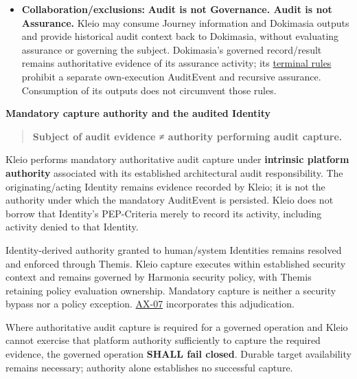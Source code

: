 \begin{itemize}
\item \textbf{Collaboration/exclusions:} \textbf{Audit is not Governance. Audit is not Assurance.}
  Kleio may consume Journey information and Dokimasia outputs and provide
  historical audit context back to Dokimasia, without evaluating assurance or
  governing the subject. Dokimasia's governed record/result remains authoritative
  evidence of its assurance activity; its \href{\detokenize{../../../../../docs/markdown/05-information-systems-architecture/component-register.md#dokimasia-terminal-boundaries}}{terminal rules}
  prohibit a separate own-execution AuditEvent and recursive assurance. Consumption
  of its outputs does not circumvent those rules.

\end{itemize}






\par\medskip\textbf{Mandatory capture authority and the audited Identity}\par


\begin{quote}


\textbf{Subject of audit evidence ≠ authority performing audit capture.}



\end{quote}


Kleio performs mandatory authoritative audit capture under \textbf{intrinsic platform
authority} associated with its established architectural audit responsibility.
The originating/acting Identity remains evidence recorded by Kleio; it is not
the authority under which the mandatory AuditEvent is persisted. Kleio does not
borrow that Identity's PEP-Criteria merely to record its activity, including
activity denied to that Identity.



Identity-derived authority granted to human/system Identities remains resolved
and enforced through Themis. Kleio capture executes within established security
context and remains governed by Harmonia security policy, with Themis retaining
policy evaluation ownership. Mandatory capture is neither a security bypass nor
a policy exception. \href{\detokenize{../../../../governance/architectural-axioms.md#kleio-mandatory-capture-authority}}{AX-07}
incorporates this adjudication.



Where authoritative audit capture is required for a governed operation and
Kleio cannot exercise that platform authority sufficiently to capture the
required evidence, the governed operation \textbf{SHALL fail closed}. Durable target
availability remains necessary; authority alone establishes no successful capture.



